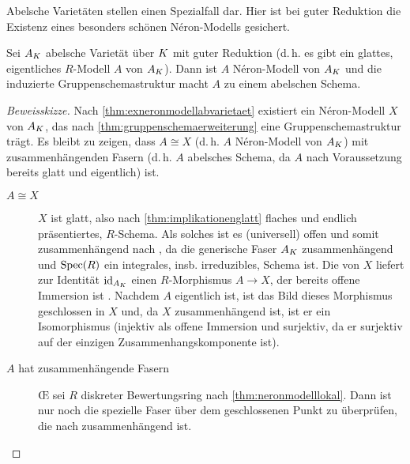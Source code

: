 \documentclass[german]{scrreprt}
\begin{document}
Abelsche Varietäten stellen einen Spezialfall dar. Hier ist bei guter
Reduktion die Existenz eines besonders schönen Néron-Modells gesichert.
\begin{Satz}\label{thm:abelscheneronmodelle}
  Sei $A_{K}$ abelsche Varietät über $K$ mit guter Reduktion
  (d.\,h. es gibt ein glattes, eigentliches $R$-Modell $A$ von $A_{K}$).
  Dann ist $A$ Néron-Modell von $A_{K}$ und die induzierte
  Gruppenschemastruktur macht $A$ zu einem abelschen Schema.
  \cite[1.4, Proposition 2]{neron}
  \begin{proof}[Beweisskizze]
    Nach \autoref{thm:exneronmodellabvarietaet} existiert ein
    Néron-Modell $X$ von $A_{K}$, das nach
    \autoref{thm:gruppenschemaerweiterung} eine Gruppenschemastruktur
    trägt.
    Es bleibt zu zeigen, dass $A\cong X$ (d.\,h. $A$ Néron-Modell von
    $A_{K}$) mit zusammenhängenden Fasern (d.\,h. $A$ abelsches Schema,
    da $A$ nach Voraussetzung bereits glatt und eigentlich) ist.
    \begin{description}
    \item[$A\cong X$] $X$ ist glatt, also nach
      \autoref{thm:implikationenglatt} flaches und endlich
      präsentiertes, $R$-Schema.
      Als solches ist es (universell) offen \cite[Theorem 14.33]{wedhorn}
      und somit zusammenhängend nach \cite[Proposition 3.24]{wedhorn},
      da die generische Faser $A_{K}$ zusammenhängend und $\operatorname{Spec}(R)$
      ein integrales, insb. irreduzibles, Schema ist.
      Die \NAbbEig von $X$ liefert zur Identität $\mathrm{id}_{A_{K}}$ einen
      $R$-Morphismus $A\to X$, der bereits offene Immersion ist
      \cite[4.3/1 (ii) oder 4.4/1]{neron}.
      Nachdem $A$ eigentlich ist, ist das Bild dieses Morphismus
      geschlossen in $X$ und, da $X$ zusammenhängend ist, ist er ein
      Isomorphismus (injektiv als offene Immersion und surjektiv, da
      er surjektiv auf der einzigen Zusammenhangskomponente ist).
    \item[$A$ hat zusammenhängende Fasern]
      \OE{} sei $R$ diskreter Bewertungsring nach
      \autoref{thm:neronmodelllokal}.
      Dann ist nur noch die spezielle Faser über dem geschlossenen
      Punkt zu überprüfen, die nach \cite[5.5.1]{EGA3} zusammenhängend
      ist.
    \end{description}
  \end{proof}
\end{Satz}
\end{document}
